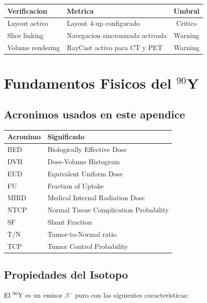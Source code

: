 \documentclass[12pt,a4paper]{article}
\begin{document}
\begin{table}[H]
\centering
\begin{tabular}{llc}
\toprule
\textbf{Verificacion} & \textbf{Metrica} & \textbf{Umbral} \\
\midrule
Layout activo & Layout 4-up configurado & Critico \\
Slice linking & Navegacion sincronizada activada & Warning \\
Volume rendering & RayCast activo para CT y PET & Warning \\
\bottomrule
\end{tabular}
\end{table}

\newpage

\appendix
\section{Fundamentos Fisicos del \texorpdfstring{$^{90}$Y}{Y-90}}

\subsection*{Acronimos usados en este apendice}
\begin{tabular}{ll}
\toprule
\textbf{Acronimo} & \textbf{Significado} \\
\midrule
BED & Biologically Effective Dose \\
DVH & Dose-Volume Histogram \\
EUD & Equivalent Uniform Dose \\
FU & Fraction of Uptake \\
MIRD & Medical Internal Radiation Dose \\
NTCP & Normal Tissue Complication Probability \\
SF & Shunt Fraction \\
T/N & Tumor-to-Normal ratio \\
TCP & Tumor Control Probability \\
\bottomrule
\end{tabular}

\subsection{Propiedades del Isotopo}

El $^{90}$Y es un emisor $\beta^-$ puro con las siguientes caracteristicas:
\end{document}
